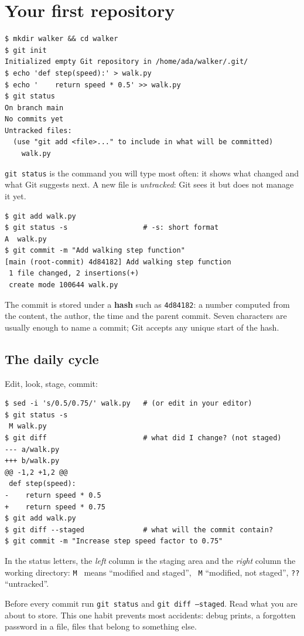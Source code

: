 \section*{Your first repository}
\begin{verbatim}
$ mkdir walker && cd walker
$ git init
Initialized empty Git repository in /home/ada/walker/.git/
$ echo 'def step(speed):' > walk.py
$ echo '    return speed * 0.5' >> walk.py
$ git status
On branch main
No commits yet
Untracked files:
  (use "git add <file>..." to include in what will be committed)
	walk.py
\end{verbatim}
\texttt{git status} is the command you will type most often: it shows what changed and what Git suggests next. A new file is \emph{untracked}: Git sees it but does not manage it yet.
\begin{verbatim}
$ git add walk.py
$ git status -s                  # -s: short format
A  walk.py
$ git commit -m "Add walking step function"
[main (root-commit) 4d84182] Add walking step function
 1 file changed, 2 insertions(+)
 create mode 100644 walk.py
\end{verbatim}
The commit is stored under a \textbf{hash} such as \texttt{4d84182}: a number computed from the content, the author, the time and the parent commit. Seven characters are usually enough to name a commit; Git accepts any unique start of the hash.

\subsection*{The daily cycle}
Edit, look, stage, commit:
\begin{verbatim}
$ sed -i 's/0.5/0.75/' walk.py   # (or edit in your editor)
$ git status -s
 M walk.py
$ git diff                       # what did I change? (not staged)
--- a/walk.py
+++ b/walk.py
@@ -1,2 +1,2 @@
 def step(speed):
-    return speed * 0.5
+    return speed * 0.75
$ git add walk.py
$ git diff --staged              # what will the commit contain?
$ git commit -m "Increase step speed factor to 0.75"
\end{verbatim}
In the status letters, the \emph{left} column is the staging area and the \emph{right} column the working directory: \texttt{M\ } means ``modified and staged'', \texttt{\ M} ``modified, not staged'', \texttt{??} ``untracked''.

\begin{keyidea}
Before every commit run \texttt{git status} and \texttt{git diff --staged}. Read what you are about to store. This one habit prevents most accidents: debug prints, a forgotten password in a file, files that belong to something else.
\end{keyidea}

